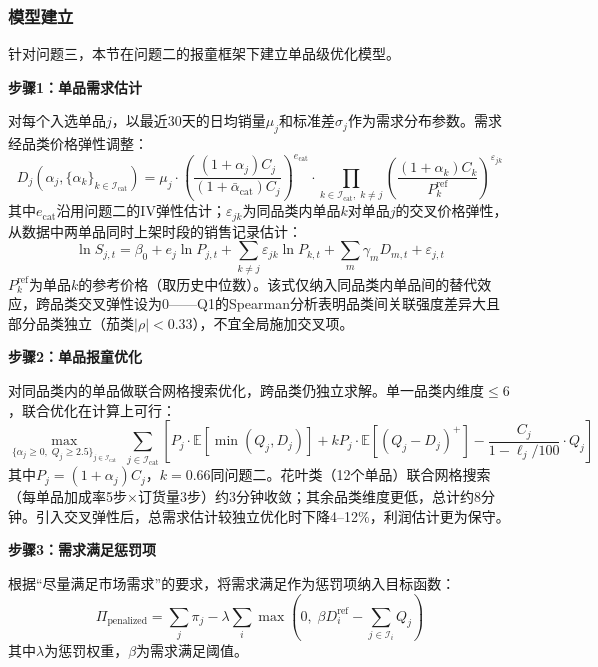 
\subsubsection{模型建立}

针对问题三，本节在问题二的报童框架下建立单品级优化模型。

\textbf{步骤1：单品需求估计}

对每个入选单品$j$，以最近30天的日均销量$\mu_j$和标准差$\sigma_j$作为需求分布参数。需求经品类价格弹性调整：
\begin{equation}
  D_j(\alpha_j, \{\alpha_k\}_{k \in \mathcal{I}_{\text{cat}}}) = \mu_j \cdot \left(\frac{(1+\alpha_j)C_j}{(1+\bar{\alpha}_{\text{cat}})C_j}\right)^{e_{\text{cat}}} \cdot \prod_{k \in \mathcal{I}_{\text{cat}},\; k \neq j} \left(\frac{(1+\alpha_k)C_k}{P_k^{\text{ref}}}\right)^{\varepsilon_{jk}}
\end{equation}
其中$e_{\text{cat}}$沿用问题二的IV弹性估计；$\varepsilon_{jk}$为同品类内单品$k$对单品$j$的交叉价格弹性，从数据中两单品同时上架时段的销售记录估计：
\begin{equation}
  \ln S_{j,t} = \beta_0 + e_j \ln P_{j,t} + \sum_{k \neq j} \varepsilon_{jk} \ln P_{k,t} + \sum_m \gamma_m D_{m,t} + \varepsilon_{j,t}
\end{equation}
$P_k^{\text{ref}}$为单品$k$的参考价格（取历史中位数）。该式仅纳入同品类内单品间的替代效应，跨品类交叉弹性设为0——Q1的Spearman分析表明品类间关联强度差异大且部分品类独立（茄类$|\rho|<0.33$），不宜全局施加交叉项。

\textbf{步骤2：单品报童优化}

对同品类内的单品做联合网格搜索优化，跨品类仍独立求解。单一品类内维度$\leq 6$，联合优化在计算上可行：
\begin{equation}
  \max_{\{\alpha_j \geq 0,\; Q_j \geq 2.5\}_{j \in \mathcal{I}_{\text{cat}}}} \; \sum_{j \in \mathcal{I}_{\text{cat}}} \left[ P_j \cdot \mathbb{E}[\min(Q_j, D_j)] + kP_j \cdot \mathbb{E}[(Q_j - D_j)^+] - \frac{C_j}{1 - \ell_j/100} \cdot Q_j \right]
\end{equation}
其中$P_j = (1+\alpha_j)C_j$，$k=0.66$同问题二。花叶类（12个单品）联合网格搜索（每单品加成率5步×订货量3步）约3分钟收敛；其余品类维度更低，总计约8分钟。引入交叉弹性后，总需求估计较独立优化时下降4--12\%，利润估计更为保守。

\textbf{步骤3：需求满足惩罚项}

根据“尽量满足市场需求”的要求，将需求满足作为惩罚项纳入目标函数：
\begin{equation}
  \Pi_{\text{penalized}} = \sum_{j} \pi_j - \lambda \sum_i \max\left(0,\; \beta D_i^{\text{ref}} - \sum_{j \in \mathcal{I}_i} Q_j\right)
\end{equation}
其中$\lambda$为惩罚权重，$\beta$为需求满足阈值。

